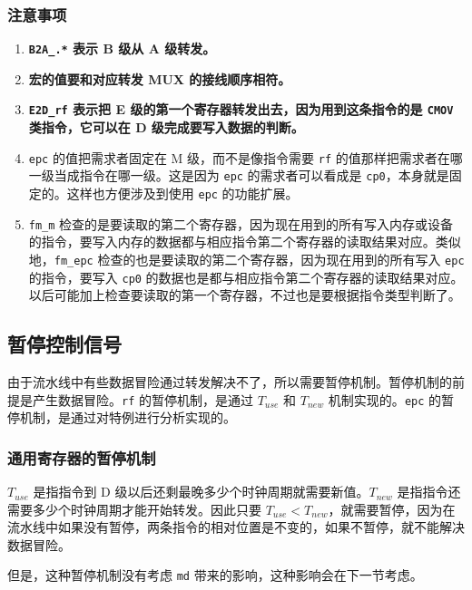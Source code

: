 \documentclass[12pt,AutoFakeBold,AutoFakeSlant]{article}
\providecommand{\tightlist}{%
  \setlength{\itemsep}{0pt}\setlength{\parskip}{0pt}}
\newcommand{\ms}[1]{\texttt{#1}}
\begin{document}
\subsubsection{注意事项}

\begin{enumerate}
\def\labelenumi{\arabic{enumi}.}
\tightlist
\item
  \textbf{\texttt{B2A\_.*} 表示 B 级从 A 级转发。}
\item
  \textbf{宏的值要和对应转发 MUX 的接线顺序相符。}
\item
  \textbf{\texttt{E2D\_rf} 表示把 E
  级的第一个寄存器转发出去，因为用到这条指令的是 \texttt{CMOV}
  类指令，它可以在 D 级完成要写入数据的判断。}
\item
  \ms{epc} 的值把需求者固定在 M 级，而不是像指令需要 \ms{rf} 的值那样把需求者在哪一级当成指令在哪一级。这是因为 \ms{epc} 的需求者可以看成是 \ms{cp0}，本身就是固定的。这样也方便涉及到使用 \ms{epc} 的功能扩展。
\item
  \texttt{fm\_m} 检查的是要读取的第二个寄存器，因为现在用到的所有写入内存或设备的指令，要写入内存的数据都与相应指令第二个寄存器的读取结果对应。类似地，\texttt{fm\_epc} 检查的也是要读取的第二个寄存器，因为现在用到的所有写入 \texttt{epc} 的指令，要写入 \texttt{cp0} 的数据也是都与相应指令第二个寄存器的读取结果对应。以后可能加上检查要读取的第一个寄存器，不过也是要根据指令类型判断了。
\end{enumerate}

\hypertarget{ux6682ux505cux63a7ux5236ux4fe1ux53f7}{%
\subsection{暂停控制信号}\label{ux6682ux505cux63a7ux5236ux4fe1ux53f7}}

由于流水线中有些数据冒险通过转发解决不了，所以需要暂停机制。暂停机制的前提是产生数据冒险。\ms{rf} 的暂停机制，是通过 $ T_{use} $ 和 $ T_{new} $ 机制实现的。\ms{epc} 的暂停机制，是通过对特例进行分析实现的。

\subsubsection{通用寄存器的暂停机制}

$ T_{use} $ 是指指令到 D 级以后还剩最晚多少个时钟周期就需要新值。$ T_{new} $ 是指指令还需要多少个时钟周期才能开始转发。因此只要 $ T_{use} < T_{new} $，就需要暂停，因为在流水线中如果没有暂停，两条指令的相对位置是不变的，如果不暂停，就不能解决数据冒险。

但是，这种暂停机制没有考虑 \ms{md} 带来的影响，这种影响会在下一节考虑。
\end{document}
